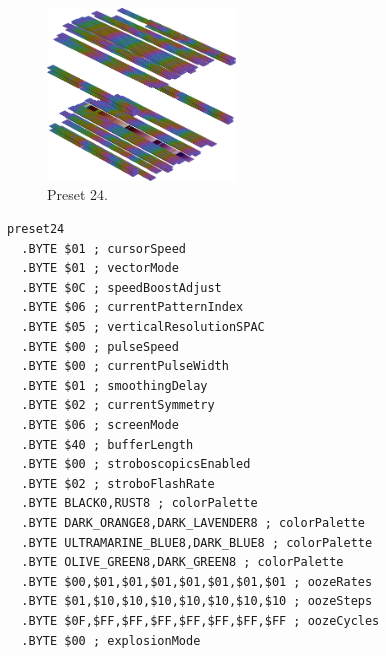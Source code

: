 \clearpage
\begin{minipage}[b]{0.48\linewidth}
\begin{figure}[H]                                                          
  \centering                                                             
  \begin{adjustbox}{width=5cm,center}                                   
  \includegraphics[width=5cm]{src/colorspace_presets/preset24-45.png}%
  \end{adjustbox}                                                        
\caption*{Preset 24.}                                           
\end{figure}                                                               
\end{minipage}
\hspace{0.1cm}
\begin{minipage}[b]{0.48\linewidth}                            
\begin{lstlisting}[basicstyle=\ttfamily\tiny]
preset24
  .BYTE $01 ; cursorSpeed
  .BYTE $01 ; vectorMode
  .BYTE $0C ; speedBoostAdjust
  .BYTE $06 ; currentPatternIndex
  .BYTE $05 ; verticalResolutionSPAC
  .BYTE $00 ; pulseSpeed
  .BYTE $00 ; currentPulseWidth
  .BYTE $01 ; smoothingDelay
  .BYTE $02 ; currentSymmetry
  .BYTE $06 ; screenMode
  .BYTE $40 ; bufferLength
  .BYTE $00 ; stroboscopicsEnabled
  .BYTE $02 ; stroboFlashRate
  .BYTE BLACK0,RUST8 ; colorPalette
  .BYTE DARK_ORANGE8,DARK_LAVENDER8 ; colorPalette
  .BYTE ULTRAMARINE_BLUE8,DARK_BLUE8 ; colorPalette
  .BYTE OLIVE_GREEN8,DARK_GREEN8 ; colorPalette
  .BYTE $00,$01,$01,$01,$01,$01,$01,$01 ; oozeRates
  .BYTE $01,$10,$10,$10,$10,$10,$10,$10 ; oozeSteps
  .BYTE $0F,$FF,$FF,$FF,$FF,$FF,$FF,$FF ; oozeCycles
  .BYTE $00 ; explosionMode
\end{lstlisting}
\end{minipage}

\vspace*{0.3cm}

